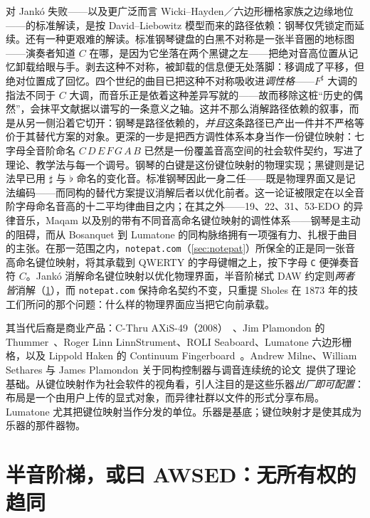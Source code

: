 \documentclass[10pt,letterpaper,twocolumn]{article}
\begin{document}
对 Jankó 失败——以及更广泛而言 Wicki--Hayden／六边形栅格家族之边缘地位——的标准解读，是按 David--Liebowitz 模型而来的路径依赖：钢琴仅凭锁定而延续。还有一种更艰难的解读。标准钢琴键盘的白黑不对称是一张半音圈的地标图——演奏者知道 $C$ 在哪，是因为它坐落在两个黑键之左——把绝对音高位置从记忆卸载给眼与手。剥去这种不对称，被卸载的信息便无处落脚：移调成了平移，但绝对位置成了回忆。四个世纪的曲目已把这种不对称吸收进\emph{调性格}——$F^\sharp$ 大调的指法不同于 $C$ 大调，而音乐正是依着这种差异写就的——故而移除这桩“历史的偶然”，会抹平文献据以谱写的一条意义之轴。这并不那么消解路径依赖的叙事，而是从另一侧沿着它切开：钢琴是路径依赖的，\emph{并且}这条路径已产出一件并不严格等价于其替代方案的对象。更深的一步是把西方调性体系本身当作一份键位映射：七字母全音阶命名 $C\,D\,E\,F\,G\,A\,B$ 已然是一份覆盖音高空间的社会软件契约，写进了理论、教学法与每一个调号。钢琴的白键是这份键位映射的物理实现；黑键则是记法早已用 $\sharp$ 与 $\flat$ 命名的变化音。标准钢琴因此一身二任——既是物理界面又是记法编码——而同构的替代方案提议消解后者以优化前者。这一论证被限定在以全音阶字母命名音高的十二平均律曲目之内；在其之外——19、22、31、53-EDO 的异律音乐，Maqam 以及别的带有不同音高命名键位映射的调性体系——钢琴是主动的阻碍，而从 Bosanquet 到 Lumatone 的同构脉络拥有一项强有力、扎根于曲目的主张。在那一范围之内，\texttt{notepat.com}（\textsection\ref{sec:notepat}）所保全的正是同一张音高命名键位映射，将其承载到 QWERTY 的字母键帽之上，按下字母 \texttt{C} 便弹奏音符 $C$。Jankó 消解命名键位映射以优化物理界面，半音阶梯式 DAW 约定则\emph{两者皆}消解（\textsection\ref{sec:daw}），而 \texttt{notepat.com} 保持命名契约不变，只重提 Sholes 在 1873 年的技工们所问的那个问题：什么样的物理界面应当把它向前承载。

其当代后裔是商业产品：C-Thru AXiS-49（2008）~\citep{cthru2008axis49}、Jim Plamondon 的 Thummer~\citep{plamondon2003thummer}、Roger Linn LinnStrument、ROLI Seaboard、Lumatone 六边形栅格，以及 Lippold Haken 的 Continuum Fingerboard~\citep{haken1998indiscrete}。Andrew Milne、William Sethares 与 James Plamondon 关于同构控制器与调音连续统的论文~\citep{milne2007isomorphic,milne2008tuning}提供了理论基础。从键位映射作为社会软件的视角看，引人注目的是这些乐器\emph{出厂即可配置}：布局是一个由用户上传的显式对象，而异律社群以文件的形式分享布局。Lumatone 尤其把键位映射当作分发的单位。乐器是基底；键位映射才是使其成为乐器的那件器物。

\section{半音阶梯，或曰 AWSED：无所有权的趋同}
\label{sec:daw}
\end{document}

